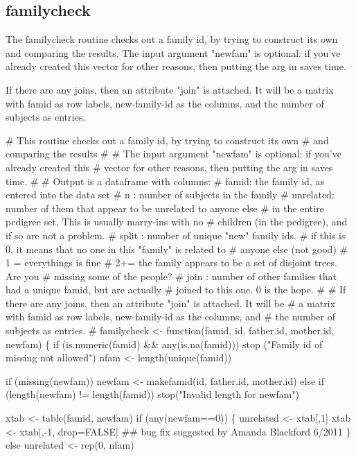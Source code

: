 \documentclass{article}
\begin{document}
\subsection{familycheck}
The familycheck routine checks out a family id, by trying to construct its own
and comparing the results.
The input argument "newfam" is optional: if you've already created this
vector for other reasons, then putting the arg in saves time.


  If there are any joins, then an attribute "join" is attached.  It will be
   a matrix with famid as row labels, new-family-id as the columns, and
   the number of subjects as entries.  

\nwenddocs{}\endmoddef
# This routine checks out a family id, by trying to construct its own
#  and comparing the results
#
# The input argument "newfam" is optional: if you've already created this
#   vector for other reasons, then putting the arg in saves time.
#
# Output is a dataframe with columns:
#   famid: the family id, as entered into the data set
#   n    : number of subjects in the family
#   unrelated: number of them that appear to be unrelated to anyone else 
#          in the entire pedigree set.  This is usually marry-ins with no 
#          children (in the pedigree), and if so are not a problem.
#   split : number of unique "new" family ids.
#            if this is 0, it means that no one in this "family" is related to
#                   anyone else (not good)
#            1 = everythings is fine
#            2+= the family appears to be a set of disjoint trees.  Are you
#                 missing some of the people?
#   join : number of other families that had a unique famid, but are actually
#            joined to this one.  0 is the hope.
#
#  If there are any joins, then an attribute "join" is attached.  It will be
#   a matrix with famid as row labels, new-family-id as the columns, and
#   the number of subjects as entries.  
#
familycheck <- function(famid, id, father.id, mother.id, newfam) \{
    if (is.numeric(famid) && any(is.na(famid)))
        stop ("Family id of missing not allowed")
    nfam <- length(unique(famid))

    if (missing(newfam)) newfam <- makefamid(id, father.id, mother.id)
    else if (length(newfam) != length(famid))
        stop("Invalid length for newfam")

    xtab <- table(famid, newfam)
    if (any(newfam==0)) \{
        unrelated <- xtab[,1]
        xtab <- xtab[,-1, drop=FALSE] 
        ## bug fix suggested by Amanda Blackford 6/2011
      \}
    else unrelated <-  rep(0, nfam)
\end{document}
